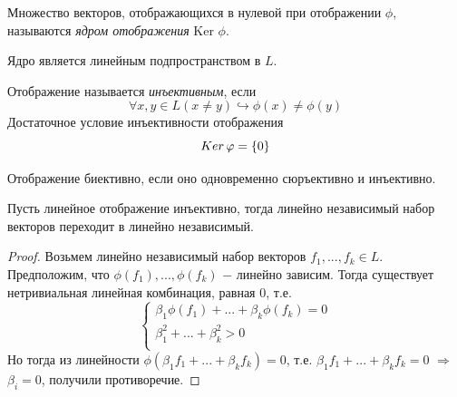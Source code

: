 \begin{definition}
    Множество векторов, отображающихся в нулевой при отображении $\phi$, называются \textit{ядром отображения} Ker $\phi$.
\end{definition}

Ядро является линейным подпространством в $L$.

\begin{definition}
    Отображение называется \textit{инъективным}, если 
    \[
    \forall x, y \in L (x \neq y) \hookrightarrow \phi(x)\neq\phi(y)
    \]
    Достаточное условие инъективности отображения 
    \[
    Ker\thinspace\phi = \{0\}
    \]
\end{definition}

\begin{definition}
    Отображение $\textit{биективно}$, если оно одновременно сюръективно и инъективно.
\end{definition}

\begin{proposition}
    Пусть линейное отображение инъективно, тогда линейно независимый набор векторов переходит в линейно независимый.
\end{proposition}
\begin{proof}
    Возьмем линейно независимый набор векторов $f_1, ..., f_k \in L$.\\
    Предположим, что $\phi(f_1), ..., \phi(f_k)$ $-$ линейно зависим. Тогда существует нетривиальная линейная комбинация, равная 0, т.е.
    \[
    \begin{cases}
        \beta_1\phi(f_1) + ... + \beta_k\phi(f_k) = 0\\
        \beta_1^2 + ... + \beta_k^2 > 0\\
    \end{cases}
    \]
    Но тогда из линейности $\phi(\beta_1f_1 + ... + \beta_kf_k) = 0$, т.е. $\beta_1f_1 + ... + \beta_kf_k = 0$ $\Longrightarrow$ $\beta_i = 0$, получили противоречие.
\end{proof}

